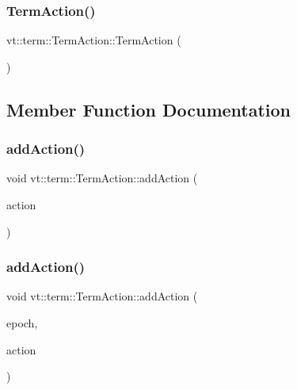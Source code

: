 \subsubsection{\texorpdfstring{Term\+Action()}{TermAction()}}
{\footnotesize\ttfamily vt\+::term\+::\+Term\+Action\+::\+Term\+Action (\begin{DoxyParamCaption}{ }\end{DoxyParamCaption})\hspace{0.3cm}{\ttfamily [default]}}



\subsection{Member Function Documentation}
\mbox{\label{structvt_1_1term_1_1_term_action_a1227042cb4eb38937fb8ed34bcbdf998}} 
\subsubsection{\texorpdfstring{add\+Action()}{addAction()}\hspace{0.1cm}{\footnotesize\ttfamily [1/2]}}
{\footnotesize\ttfamily void vt\+::term\+::\+Term\+Action\+::add\+Action (\begin{DoxyParamCaption}\item[{\hyperlink{namespacevt_ae0a5a7b18cc99d7b732cb4d44f46b0f3}{Action\+Type}}]{action }\end{DoxyParamCaption})}

\mbox{\label{structvt_1_1term_1_1_term_action_a15b79357805676e1ff2f880b02fd4061}} 
\subsubsection{\texorpdfstring{add\+Action()}{addAction()}\hspace{0.1cm}{\footnotesize\ttfamily [2/2]}}
{\footnotesize\ttfamily void vt\+::term\+::\+Term\+Action\+::add\+Action (\begin{DoxyParamCaption}\item[{\hyperlink{namespacevt_a985a5adf291c34a3ca263b3378388236}{Epoch\+Type} const \&}]{epoch,  }\item[{\hyperlink{namespacevt_ae0a5a7b18cc99d7b732cb4d44f46b0f3}{Action\+Type}}]{action }\end{DoxyParamCaption})}

